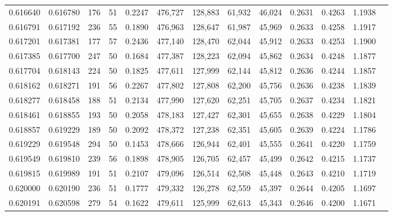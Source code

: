 \begin{tabular}{rrrrrrrrrrrrr}
0.616640 & 0.616780 &   176 &  51 &                                     0.2247 & 476,727 & 128,883 &  61,932 &  46,024 & 0.2631 & 0.4263 & 1.1938 \\
0.616791 & 0.617192 &   236 &  55 &                                     0.1890 & 476,963 & 128,647 &  61,987 &  45,969 & 0.2633 & 0.4258 & 1.1917 \\
0.617201 & 0.617381 &   177 &  57 &                                     0.2436 & 477,140 & 128,470 &  62,044 &  45,912 & 0.2633 & 0.4253 & 1.1900 \\
0.617385 & 0.617700 &   247 &  50 &                                     0.1684 & 477,387 & 128,223 &  62,094 &  45,862 & 0.2634 & 0.4248 & 1.1877 \\
0.617704 & 0.618143 &   224 &  50 &                                     0.1825 & 477,611 & 127,999 &  62,144 &  45,812 & 0.2636 & 0.4244 & 1.1857 \\
0.618162 & 0.618271 &   191 &  56 &                                     0.2267 & 477,802 & 127,808 &  62,200 &  45,756 & 0.2636 & 0.4238 & 1.1839 \\
0.618277 & 0.618458 &   188 &  51 &                                     0.2134 & 477,990 & 127,620 &  62,251 &  45,705 & 0.2637 & 0.4234 & 1.1821 \\
0.618461 & 0.618855 &   193 &  50 &                                     0.2058 & 478,183 & 127,427 &  62,301 &  45,655 & 0.2638 & 0.4229 & 1.1804 \\
0.618857 & 0.619229 &   189 &  50 &                                     0.2092 & 478,372 & 127,238 &  62,351 &  45,605 & 0.2639 & 0.4224 & 1.1786 \\
0.619229 & 0.619548 &   294 &  50 &                                     0.1453 & 478,666 & 126,944 &  62,401 &  45,555 & 0.2641 & 0.4220 & 1.1759 \\
0.619549 & 0.619810 &   239 &  56 &                                     0.1898 & 478,905 & 126,705 &  62,457 &  45,499 & 0.2642 & 0.4215 & 1.1737 \\
0.619815 & 0.619989 &   191 &  51 &                                     0.2107 & 479,096 & 126,514 &  62,508 &  45,448 & 0.2643 & 0.4210 & 1.1719 \\
0.620000 & 0.620190 &   236 &  51 &                                     0.1777 & 479,332 & 126,278 &  62,559 &  45,397 & 0.2644 & 0.4205 & 1.1697 \\
0.620191 & 0.620598 &   279 &  54 &                                     0.1622 & 479,611 & 125,999 &  62,613 &  45,343 & 0.2646 & 0.4200 & 1.1671 \\

\end{tabular}
